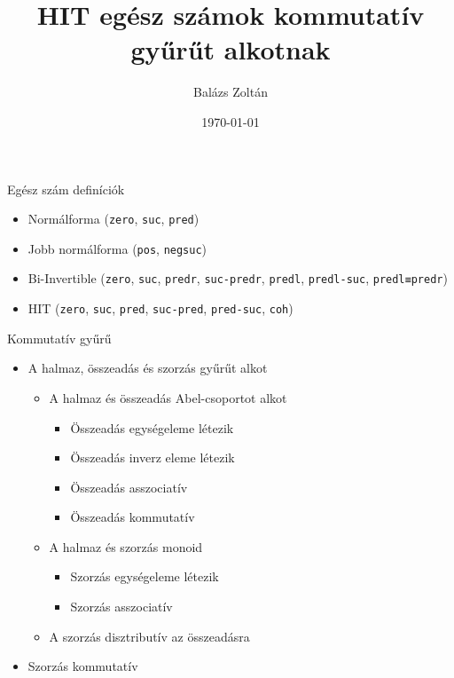 \documentclass[14pt, aspectratio=1610]{beamer}
\title{HIT egész számok kommutatív gyűrűt alkotnak}
\institute{Eötvös Loránd Tudományegyetem}
\author{Balázs Zoltán}
\date{\today}
\begin{document}
\maketitle

\begin{frame}[fragile]{Egész szám definíciók}

\begin{itemize}
    \item<+-> Normálforma (\texttt{zero}, \texttt{suc}, \texttt{pred})
    \item<+-> Jobb normálforma (\texttt{pos}, \texttt{negsuc})
    \item<+-> Bi-Invertible (\texttt{zero}, \texttt{suc}, \texttt{predr}, \texttt{suc-predr}, \texttt{predl}, \texttt{predl-suc}, \texttt{predl≡predr})
    \item<+-> HIT (\texttt{zero}, \texttt{suc}, \texttt{pred}, \texttt{suc-pred}, \texttt{pred-suc}, \texttt{coh})
\end{itemize}

\end{frame}

\begin{frame}[fragile]{Kommutatív gyűrű}

\begin{itemize}
    \item<+-> A halmaz, összeadás és szorzás gyűrűt alkot
      \begin{itemize}
        \item<+-> A halmaz és összeadás Abel-csoportot alkot
          \begin{itemize}
            \item<+-> Összeadás egységeleme létezik
            \item<+-> Összeadás inverz eleme létezik
            \item<+-> Összeadás asszociatív
            \item<+-> Összeadás kommutatív
          \end{itemize}
        \item<+-> A halmaz és szorzás monoid
          \begin{itemize}
            \item<+-> Szorzás egységeleme létezik
            \item<+-> Szorzás asszociatív
          \end{itemize}
        \item<+-> A szorzás disztributív az összeadásra
      \end{itemize}
    \item<+-> Szorzás kommutatív
\end{itemize}

\end{frame}
\end{document}
